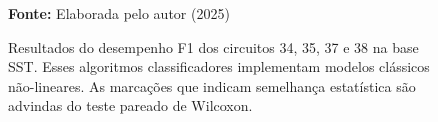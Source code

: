 \begin{figure}
\caption{Resultados do desempenho F1 dos circuitos 34, 35, 37 e 38 na base \gls{SST}. Esses algoritmos classificadores implementam modelos clássicos não-lineares. As marcações que indicam semelhança estatística são advindas do teste pareado de Wilcoxon.}
\label{fig:f1:sst:g5}
     \centering
    \centering

      \par\medskip\ABNTEXfontereduzida\selectfont\textbf{Fonte:} Elaborada pelo autor (2025) \par\medskip
\end{figure}